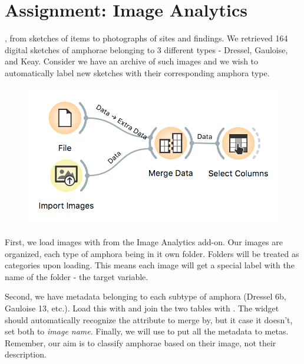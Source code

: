 \chapter{Assignment: Image Analytics}
\label{ch:arheo_image_analytics}

, from sketches of items to photographs of sites and findings. We retrieved 164 digital sketches of amphorae belonging to 3 different types - Dressel, Gauloise, and Keay. Consider we have an archive of such images and we wish to automatically label new sketches with their corresponding amphora type.

\begin{figure}
    \vspace{-0.5cm}
    \includegraphics[scale=0.6]{intermediate-workflow.png}
\end{figure}

First, we load images with  from the Image Analytics add-on. Our images are organized, each type of amphora being in it own folder. Folders will be treated as categories upon loading. This means each image will get a special label with the name of the folder - the target variable.

Second, we have metadata belonging to each subtype of amphora (Dressel 6b, Gauloise 13, etc.). Load this with  and join the two tables with . The widget should automatically recognize the attribute to merge by, but it case it doesn't, set both to \textit{image name}. Finally, we will use  to put all the metadata to metas. Remember, our aim is to classify amphorae based on their image, not their description.

